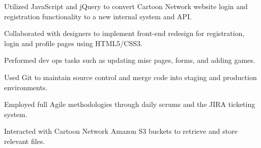 \documentclass[]{deedy-resume-openfont}
\begin{document}
\begin{minipage}[t]{0.66\textwidth}
\begin{tightemize}
\item Utilized JavaScript and jQuery to convert Cartoon Network website login and registration functionality to a new internal system and API.
\item Collaborated with designers to implement front-end redesign for registration, login and profile pages using HTML5/CSS3.
\item Performed dev ops tasks such as updating misc pages, forms, and adding games.
\item Used Git to maintain source control and merge code into staging and production environments.
\item Employed full Agile methodologies through daily scrums and the JIRA ticketing system.
\item Interacted with Cartoon Network Amazon S3 buckets to retrieve and store relevant files.
\end{tightemize}
\sectionsep

\end{minipage} 
\end{document}
